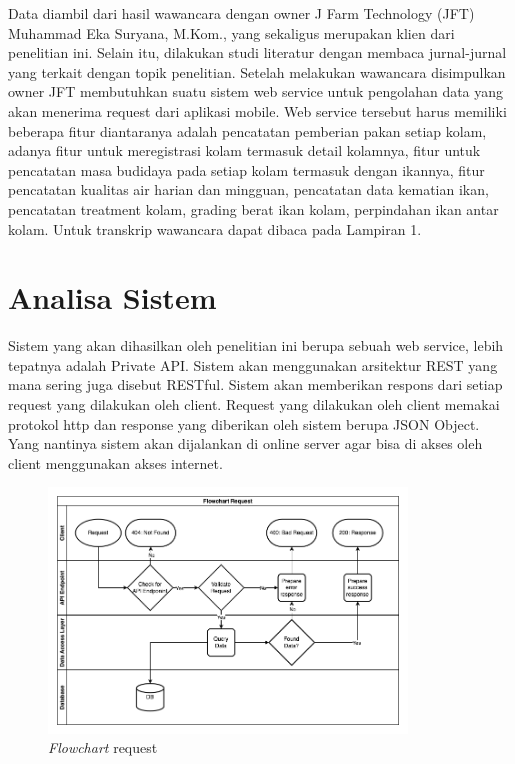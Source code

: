 Data diambil dari hasil wawancara dengan owner J Farm Technology (JFT) Muhammad Eka Suryana, M.Kom., yang sekaligus merupakan klien dari penelitian ini. Selain itu, dilakukan studi literatur dengan membaca jurnal-jurnal yang terkait dengan topik penelitian. Setelah melakukan wawancara disimpulkan owner JFT membutuhkan suatu sistem web service untuk pengolahan data yang akan menerima request dari aplikasi mobile. Web service tersebut harus memiliki beberapa fitur diantaranya adalah pencatatan pemberian pakan setiap kolam, adanya fitur untuk meregistrasi kolam termasuk detail kolamnya, fitur untuk pencatatan masa budidaya pada setiap kolam termasuk dengan ikannya, fitur pencatatan kualitas air harian dan mingguan, pencatatan data kematian ikan, pencatatan treatment kolam, grading berat ikan kolam, perpindahan ikan antar kolam. Untuk transkrip wawancara dapat dibaca pada Lampiran 1.

\section{Analisa Sistem}

Sistem yang akan dihasilkan oleh penelitian ini berupa sebuah web service, lebih tepatnya adalah Private API. Sistem akan menggunakan arsitektur REST yang mana sering juga disebut RESTful. Sistem akan memberikan respons dari setiap request yang dilakukan oleh client. Request yang dilakukan oleh client memakai protokol http dan response yang diberikan oleh sistem berupa JSON Object. Yang nantinya sistem akan dijalankan di online server agar bisa di akses oleh client menggunakan akses internet.

\begin{figure}[H]
	\centering
	\includegraphics[width=0.85\textwidth]{gambar/flowchart_request_api.png}
	\caption{\emph{Flowchart} request}
	\label{fig:flowchart_request}
\end{figure}

